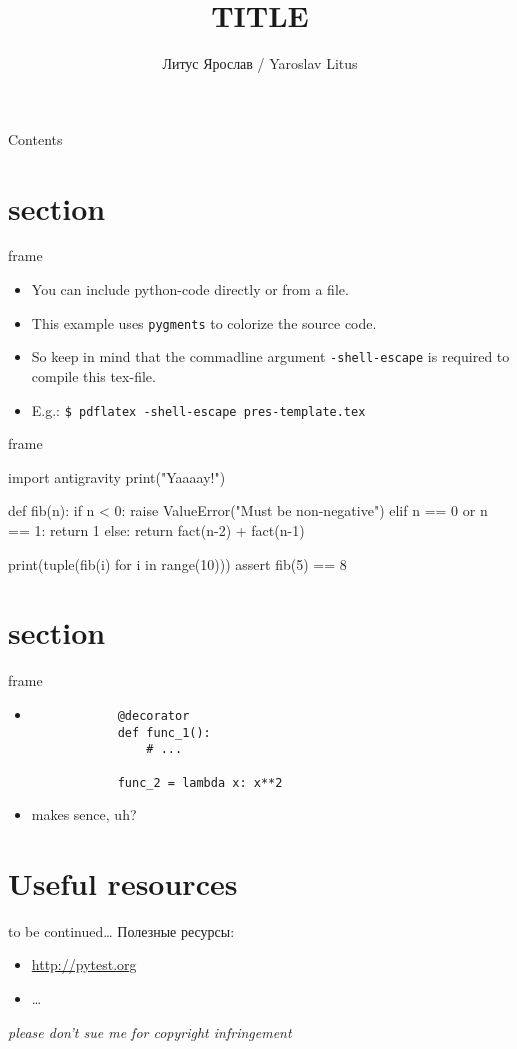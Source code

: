 \documentclass{beamer}
\title{TITLE}
\author{Литус Ярослав / Yaroslav Litus}
\institute{Группа тестирования поиска / search testing group \newline Поисковый Портал Спутник / \href{http://sputnik.ru}{sputnik.ru}}
\date{}
\begin{document}
\begin{frame}
	\titlepage
\end{frame}

\begin{frame}{Contents}
	\tableofcontents
\end{frame}

\section{section}
\begin{frame}[fragile]{frame}
	\begin{itemize}
		\item You can include python-code directly or from a file.
		\item This example uses \verb|pygments| to colorize the source code.
		\item So keep in mind that the commadline argument \verb|-shell-escape| is required to compile this tex-file.
		\item E.g.: \verb|$ pdflatex -shell-escape pres-template.tex|
		\end{itemize}
\end{frame}

\begin{frame}[fragile]{frame}
	\begin{pycode}
		import antigravity
		print("Yaaaay!")

		def fib(n):
			if n < 0:
				raise ValueError("Must be non-negative")
			elif n == 0 or n == 1:
				return 1
			else:
				return fact(n-2) + fact(n-1)

		print(tuple(fib(i) for i in range(10)))
		assert fib(5) == 8
	\end{pycode}
\end{frame}

\section{section}
\begin{frame}[fragile]{frame}
	\begin{itemize}
	\pause \item 
		\begin{verbatim}
			@decorator
			def func_1():
				# ...

			func_2 = lambda x: x**2
		\end{verbatim}
	\pause \item makes sence, uh?
	\end{itemize}
\end{frame}

\section{Useful resources}
\begin{frame}[fragile]{to be continued\ldots}
	Полезные ресурсы:
	\begin{itemize}
	\item \url{http://pytest.org}
	\item \ldots
	\end{itemize}
	\footnotesize\emph{please don't sue me for copyright infringement}
\end{frame}
\end{document}
